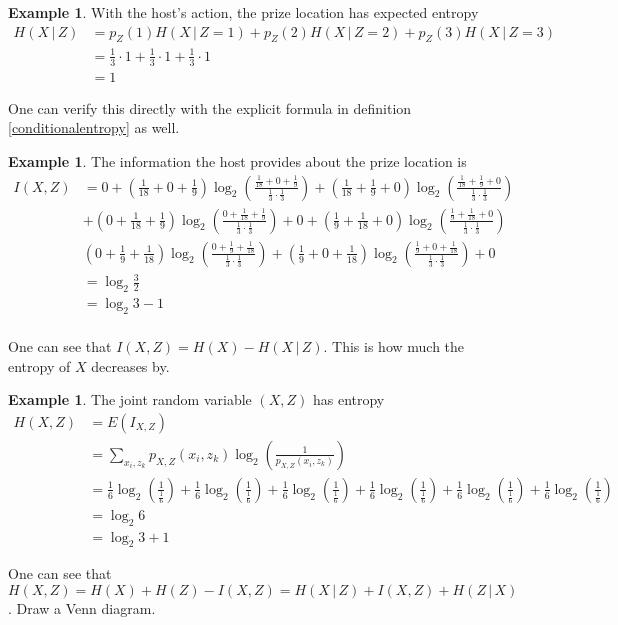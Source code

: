 \documentclass[11pt]{amsart}
\theoremstyle{definition}
\newtheorem{example}[theorem]{Example}
\begin{document}
\begin{example} With the host's action, the prize location has expected entropy
\begin{align*}
H(X \,|\, Z) & = p_Z(1)H(X \,|\, Z = 1) + p_Z(2)H(X \,|\, Z = 2) + p_Z(3)H(X \,|\, Z = 3) \\
 & = \frac{1}{3} \cdot 1 + \frac{1}{3} \cdot 1 + \frac{1}{3} \cdot 1 \\
 & = 1
\end{align*}

One can verify this directly with the explicit formula in definition \ref{conditionalentropy} as well.
\end{example}

\begin{example}\label{} The information the host provides about the prize location is
\begin{align*}
I(X, Z) & = 0 + (\frac{1}{18} + 0 + \frac{1}{9}) \log_2 \left(\frac{\frac{1}{18} + 0 + \frac{1}{9}}{\frac{1}{3} \cdot \frac{1}{3}} \right) + (\frac{1}{18} + \frac{1}{9} + 0) \log_2 \left(\frac{\frac{1}{18} + \frac{1}{9} + 0}{\frac{1}{3} \cdot \frac{1}{3}} \right) \\
 & + (0 + \frac{1}{18} + \frac{1}{9}) \log_2 \left(\frac{0 + \frac{1}{18} + \frac{1}{9}}{\frac{1}{3} \cdot \frac{1}{3}} \right) + 0 + (\frac{1}{9} + \frac{1}{18} + 0) \log_2 \left(\frac{\frac{1}{9} + \frac{1}{18} + 0}{\frac{1}{3} \cdot \frac{1}{3}} \right) \\
 & (0 + \frac{1}{9} + \frac{1}{18}) \log_2 \left(\frac{0 + \frac{1}{9} + \frac{1}{18}}{\frac{1}{3} \cdot \frac{1}{3}} \right) + (\frac{1}{9} + 0 + \frac{1}{18}) \log_2 \left(\frac{\frac{1}{9} + 0 + \frac{1}{18}}{\frac{1}{3} \cdot \frac{1}{3}} \right) + 0 \\
 & = \log_2 \frac{3}{2} \\
 & = \log_2 3 - 1 \\
\end{align*}

One can see that $I(X,Z) = H(X) - H(X \,|\, Z)$. This is how much the entropy of $X$ decreases by.
\end{example}

\begin{example}\label{jointentropyexample} The joint random variable $(X,Z)$ has entropy
\begin{align*}
H(X,Z) & = E(I_{X,Z}) \\
 & = \sum\limits_{x_i, z_k} p_{X,Z}(x_i, z_k) \log_2 \left(\frac{1}{p_{X,Z}(x_i, z_k)} \right) \\
 & = \frac{1}{6} \log_2 \left(\frac{1}{\frac{1}{6}} \right) + \frac{1}{6} \log_2 \left(\frac{1}{\frac{1}{6}} \right) + \frac{1}{6} \log_2 \left(\frac{1}{\frac{1}{6}} \right) + \frac{1}{6} \log_2 \left(\frac{1}{\frac{1}{6}} \right) + \frac{1}{6} \log_2 \left(\frac{1}{\frac{1}{6}} \right) + \frac{1}{6} \log_2 \left(\frac{1}{\frac{1}{6}} \right) \\
 & = \log_2 6 \\
 & = \log_2 3 + 1
\end{align*}

One can see that $H(X,Z) = H(X) + H(Z) - I(X,Z) = H(X \,|\, Z) + I(X,Z) + H(Z \,|\, X)$. Draw a Venn diagram.
\end{example}
\end{document}
